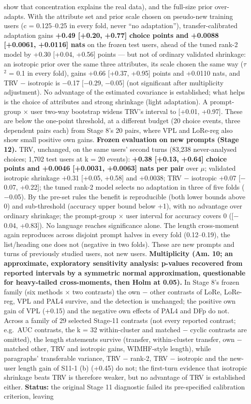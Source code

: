 \documentclass{article}
\begin{document}
show that concentration explains the real data), and the full-size prior over-adapts. With the attribute set and prior scale chosen on pseudo-new training users (c = 0.125--0.25 in every fold, never ``no adaptation''), transfer-calibrated adaptation gains \textbf{+0.49 {[}+0.20, +0.77{]} choice points and +0.0088 {[}+0.0061, +0.0116{]} nats} on the frozen test users, ahead of the tuned rank-2 model by +0.30 {[}+0.04, +0.56{]} points --- but not of ordinary validated shrinkage: an isotropic prior over the same three attributes, its scale chosen the same way ($\tau$$^2$ = 0.1 in every fold), gains +0.66 {[}+0.37, +0.95{]} points and +0.0110 nats, and TRV $-$ isotropic is $-$0.17 {[}$-$0.29, $-$0.05{]} (not significant after multiplicity adjustment). No advantage of the estimated covariance is established; what helps is the choice of attributes and strong shrinkage (light adaptation). A prompt-group $\times$ user two-way bootstrap widens TRV's interval to {[}+0.01, +0.97{]}. These are below the one-point threshold, at a different budget (20 choice events, three dependent pairs each) from Stage 8's 20 pairs, where VPL and LoRe-reg also show small positive own gains. \textbf{Frozen evaluation on new prompts (Stage 12).} TRV, unchanged, on the same users' second turns (83,238 never-analysed choices; 1,702 test users at k = 20 events): \textbf{+0.38 {[}+0.13, +0.64{]} choice points and +0.0046 {[}+0.0031, +0.0063{]} nats per pair} over $\mu$; validated isotropic shrinkage +0.31 {[}+0.05, +0.58{]} and +0.0038; TRV $-$ isotropic +0.07 {[}$-$0.07, +0.22{]}; the tuned rank-2 model selects no adaptation in three of five folds ($-$0.05). By the pre-set rules the benefit is reproducible (both lower bounds above 0) and sub-threshold (accuracy upper bound below +1), with no advantage over ordinary shrinkage; the prompt-group $\times$ user interval for accuracy covers 0 ({[}$-$0.04, +0.83{]}). No language reaches significance alone. The length cross-moment again reproduces across disjoint prompt halves in every fold (0.12--0.19), the list/heading one does not (negative in two folds). These are new prompts and turns of previously studied users, not new users. \textbf{Multiplicity (Am. 10; an approximate, exploratory sensitivity analysis: p-values recovered from reported intervals by a symmetric normal approximation, questionable for heavy-tailed cross-moments, then Holm at 0.05).} In Stage 8's frozen family (six methods $\times$ two contrasts) the own $-$ other contrasts of LoRe, LoRe-reg, VPL and PAL4 survive, and the detection is unchanged; the positive own gain of VPL (+0.15) and the negative own effects of PAL4 and DFp do not. Across a family of 29 selected Stage-11 contrasts (not every reported contrast; e.g.~AUC contrasts, the k = 32 within-cluster and matched $-$ cyclic contrasts are omitted), the length statements survive (transfer, within-cluster transfer, own $-$ matched other, TRV and isotropic gains, WIMHF-style length), while paragraphs' transferable variance, TRV $-$ rank-2, TRV $-$ isotropic and the new-user length gain of S11-1 (b) (+0.45) do not; the first-turn evidence that isotropic shrinkage beats TRV is therefore weaker, but no advantage of TRV is established either. \textbf{Status:} the original Stage 11 diagnostic failed its pre-specified calibration criterion, leaving 
\end{document}

